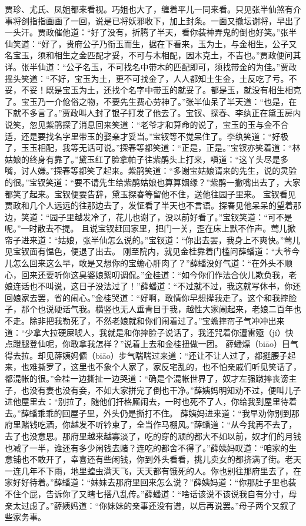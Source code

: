 \documentclass[12pt,oneside]{book}
\begin{document}
贾珍、尤氏、凤姐都来看视。巧姐也大了，缠着平儿一同来看。只见张半仙煞有介事将剑指指画画了一回，说是已将妖邪收下，加上封条。一面又撤坛谢将，早出了一头汗。贾政催他道：“好了没有，折腾了半天，看你装神弄鬼的倒也好笑。”张半仙笑道：“好了，贵府公子乃衔玉而生，据在下看来，玉为土，与金相生，公子又名宝玉，须和相生之金匹配才妥，不可与木相配，因木克土，不吉也。”贾政便问其详。张半仙道：“公子名玉，不可找名中带木的匹配即可，须找带金的为佳。”贾政摇头笑道：“不好，宝玉为土，更不可找金了，人人都知土生金，土反吃了亏。不妥，不妥！既是宝玉为土，还找个名字中带玉的就妥了。都是玉，就没有相生相克了。宝玉乃一介伧俗之物，不要先生费心劳神了。”张半仙呆了半天道：“也是，在下就不多言了。”贾政叫人封了银子打发了他去了。宝钗、探春、李纨正在黛玉房内说笑，忽见紫鹃探了消息回来笑道：“老爷才和算命的说了，宝玉的玉与金不合适，还是要找名字里带玉的娶亲才妥当。”宝钗等不觉呆住了。李纨笑道：“好极了，玉玉相配，我等无话可说。”探春等都笑道：“正是，正是。”宝钗亦笑着道：“林姑娘的终身有靠了。”黛玉红了脸拿帕子往紫鹃头上打来，嗔道：“这丫头尽是多嘴，讨人嫌。”探春等都笑了起来。紫鹃笑道：“多谢宝姑娘请来的先生，说的灵验的很。”宝钗笑道：“要不请先生给紫鹃姑娘也算算姻缘？”紫鹃一撇嘴出去了，大家都笑了起来。宝钗便要告辞，黛玉探春等留他不住，送他往园子里来。
宝钗看见贾政和几个人远远的往那边去了，发怔看了半天也不言语。探春见他呆呆的望着那边，笑道：“园子里越发冷了，花儿也谢了，没以前好看了。”宝钗笑道：“可不是呢。”一时散去不提。
且说宝钗赶回家里，把门一关，歪在床上默不作声。莺儿掀帘子进来道：“姑娘，张半仙怎么说的。”宝钗道：“你出去罢，我身上不爽快。”莺儿见宝钗面有愠色，便退了出去。
刚至院内，就见金桂靠着门槛问薛蟠道：“大爷今儿怎么回来这么早，敢是又想你的宝蟾心肝肉了？”薛蟠没好气道：“在外头不顺心，回来还要听你这臭婆娘絮叨调侃。”金桂道：“如今你们作法合伙儿欺负我，老娘连话也不叫说，这日子没法过了！”薛蟠道：“不过就不过，我这就写休书，你还回娘家去罢，省的闹心。”金桂哭道：“好啊，敢情你早想撵我走了。这个和我摔脸子，那个也说硬话气我。横竖也无人垂青目于我，越性大家闹起来，老娘二百年也不走。除非把我勒死了，不然老娘就和你们闹着过了。”宝蟾摔帘子气冲冲出来道：“少拿大拉硬屎唬人，我就是和你摔脸子说话了，我还咒着你遭雷殛（jí）快点蹬腿登仙呢，你敢拿我怎样？”说着上去和金桂扭做一团。
薛蟠熛（biāo）目气得去拉。却见薛姨妈儦（biāo）步气喘喘过来道：“还让不让人过了，都挺腰子起来，也难撕罗了，这里也不象个人家了，家反宅乱的，也不怕亲戚们听见笑话了，都混帐的很。”金桂一边撕扯一边哭道：“确是个混帐世界了，奴才左强蹾摔丧谤主子，也没有妻也没有妾，不如大家拼完了倒也干净。”薛姨妈明知劝不过，便叫儿子进他屋里去：“别拉了，随他们扞格厮闹去，一时也死不了人，你给我到屋里待着去。”薛蟠乖乖的回屋子里，外头仍是撕打不住。
薛姨妈进来道：“我早劝你别到那府里赌钱吃酒，你越发不听钤束了，全当作马棚风。”薛蟠道：“从今我再不去了，去了也没意思。那府里越来越寡淡了，吃的穿的顽的都大不如以前，奴才们的月钱也减了一半，谁还有多少闲钱去赌？连吃的都舍不得了。”薛姨妈叹道：“咱家的生意铺也不敢开了，幸喜还有些闲钱，你到外头看看，挑儿卖女的都挤满了街。老天一连几年不下雨，地里蝗虫满天飞，天天都有饿死的人。你也别往那府里去了，在家好好待着。”薛蟠道：“妹妹去那府里回来怎么说？”薛姨妈道：“你那肚子里也装不住个屁，告诉你了又瞎七搭八乱传。”薛蟠道：“啥话该说不该说我自有分寸，母亲太过虑了。”薛姨妈道：“你妹妹的亲事还没有谱，以后再说罢。”母子两个又叙了些家务事。
\end{document}
